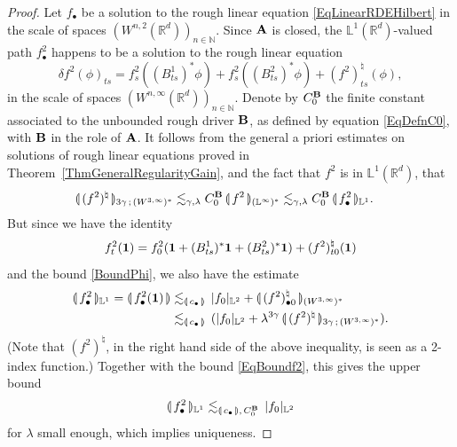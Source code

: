 \documentclass[11pt,a4paper]{amsart}
\newcommand{\NN}{\mathbb{N}}  \newcommand{\ZZ}{\mathbb{Z}}  \newcommand{\QQ}{\mathbb{Q}}  \newcommand{\HH}{\mathbb{H}}
\newcommand{\RR}{\mathbb{R}}  \newcommand{\CC}{\mathbb{C}}  \newcommand{\LL}{\mathbb{L}}  \newcommand{\WW}{\mathbb{W}}
\theoremstyle{plain}%
\theoremstyle{definition}
\theoremstyle{remark}
\numberwithin{equation}{section} %
\begin{document}
\begin{proof}
\noindent Let $f_\bullet$ be a solution to the rough linear equation \eqref{EqLinearRDEHilbert} in the scale of spaces $(W^{n,2}(\RR^d))_{n\in\NN}$. Since $\bf A$ is closed, the $\LL^1(\RR^d)$-valued path $f^2_\bullet$ happens to be a solution to the rough linear equation
\begin{equation*} 
\delta f^2(\phi)_{ts} = f^2_s((B^1_{ts})^*\phi) + f^2_s((B^2_{ts})^*\phi) + (f^2)^\natural_{ts}(\phi),
\end{equation*}
in the scale of spaces $(W^{n,\infty}(\RR^d))_{n\in\NN}$. Denote by $C_0^{\bf B}$ the finite constant associated to the unbounded rough driver $\bf B$, as defined by equation \eqref{EqDefnC0}, with $\bf B$ in the role of $\bf A$. It follows from the general a priori estimates on solutions of rough linear equations proved in Theorem~\ref{ThmGeneralRegularityGain}, and the fact that $f^2$ is in $\LL^1(\RR^d)$, that 
\begin{equation}
\label{EqBoundf2}
\begin{split}
\llparenthesis\, (f^2)^\natural \,\rrparenthesis_{3\gamma\,;\,(W^{3,\infty})^*} &\lesssim_{\gamma,\lambda}C_0^{\bf B}\,\llparenthesis\, f^2 \,\rrparenthesis_{(\LL^\infty)^*} 
\lesssim _{\gamma,\lambda} C_0^{\bf B}\,\llparenthesis\, f^2_\bullet \,\rrparenthesis_{\LL^1}.
\end{split}
\end{equation}
But since we have the identity 
$$
f^2_t({\bf 1}) = f_0^2({\bf 1} + (B^1_{ts})^*{\bf 1} + (B^2_{ts})^*{\bf 1}) + (f^2)^\natural_{t0}({\bf  1})
$$
and the bound \eqref{BoundPhi}, we also have the estimate
\begin{equation*}
\begin{split}
\llparenthesis\, f^2_\bullet \,\rrparenthesis_{\LL^1} = \llparenthesis\, f^2_\bullet({\bf 1}) \,\rrparenthesis &\lesssim_{\llparenthesis\,c_\bullet\,\rrparenthesis} \,| f_0 |_{\LL^2} + \llparenthesis\, (f^2)^\natural_{\bullet 0} \,\rrparenthesis_{(W^{3,\infty})^*}  \\
&\lesssim_{\llparenthesis\,c_\bullet\,\rrparenthesis} \, ( | f_0 |_{\LL^2} + \lambda^{3\gamma}\,\llparenthesis\, (f^2)^\natural \,\rrparenthesis_{3\gamma\,;\,(W^{3,\infty})^*} ).
\end{split}
\end{equation*}
(Note that $(f^2)^\natural$, in the right hand side of the above inequality, is seen as a 2-index function.) Together with the bound \eqref{EqBoundf2}, this gives the upper bound
$$
\llparenthesis\, f^2_\bullet \,\rrparenthesis_{\LL^1} \lesssim_{\llparenthesis\,c_\bullet\,\rrparenthesis,\,C_0^{\bf B}} \,| f_0 |_{\LL^2}
$$
for $\lambda$ small enough, which implies uniqueness.
\end{proof}
\end{document}
